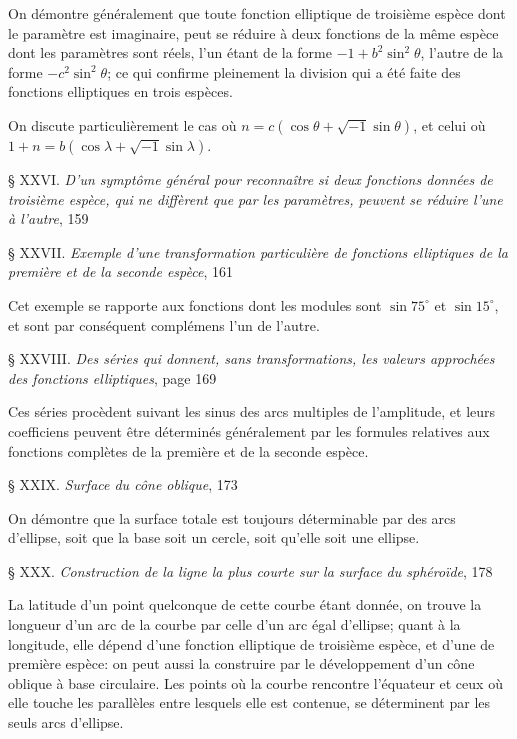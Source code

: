 \documentclass{article}
\begin{document}
On démontre généralement que toute fonction elliptique de troisième espèce dont le paramètre est imaginaire, peut se réduire à deux fonctions de la même espèce dont les paramètres sont réels, l'un étant de la forme $-1+b^{2}\sin^{2}\theta$, l'autre de la forme $-c^{2}\sin^{2}\theta$; ce qui confirme pleinement la division qui a été faite des fonctions elliptiques en trois espèces.

On discute particulièrement le cas où $n=c(\cos\theta+\sqrt{-1}\sin\theta)$, et celui où $1+n=b(\cos\lambda+\sqrt{-1}\sin\lambda)$.

§ XXVI. \emph{D'un symptôme général pour reconnaître si deux fonctions données de troisième espèce, qui ne diffèrent que par les paramètres, peuvent se réduire l'une à l'autre}, 159

§ XXVII. \emph{Exemple d'une transformation particulière de fonctions elliptiques de la première et de la seconde espèce}, 161

Cet exemple se rapporte aux fonctions dont les modules sont $\sin75^{\circ}$ et $\sin15^{\circ}$, et sont par conséquent complémens l'un de l'autre.


§ XXVIII. \emph{Des séries qui donnent, sans transformations, les valeurs approchées des fonctions elliptiques}, page 169

Ces séries procèdent suivant les sinus des arcs multiples de l'amplitude, et leurs coefficiens peuvent être déterminés généralement par les formules relatives aux fonctions complètes de la première et de la seconde espèce.

§ XXIX. \emph{Surface du cône oblique}, 173

On démontre que la surface totale est toujours déterminable par des arcs d'ellipse, soit que la base soit un cercle, soit qu'elle soit une ellipse.

§ XXX. \emph{Construction de la ligne la plus courte sur la surface du sphéroïde}, 178

La latitude d'un point quelconque de cette courbe étant donnée, on trouve la longueur d'un arc de la courbe par celle d'un arc égal d'ellipse; quant à la longitude, elle dépend d'une fonction elliptique de troisième espèce, et d'une de première espèce: on peut aussi la construire par le développement d'un cône oblique à base circulaire. Les points où la courbe rencontre l'équateur et ceux où elle touche les parallèles entre lesquels elle est contenue, se déterminent par les seuls arcs d'ellipse.
\end{document}
